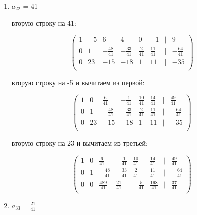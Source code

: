 \documentclass{report}
\begin{document}
\begin{itemize}
\begin{enumerate}
\begin{itemize}
		\end{itemize}
		
		
		\item{$a_{22}$ = 41}
		
		\begin{itemize}
			 вторую строку на 41:
			
			\begin{center}
				\Large{
					\[
					\begin{pmatrix}
						1 & -5 & 6 & 4 & 0 & -1 & | & 9 \\
						0 & 1 & -\frac{48}{41} & -\frac{33}{41} & \frac{2}{41} & \frac{11}{41} & | & -\frac{64}{41} \\
						0 & 23 & -15 & -18 & 1 & 11 & | & -35 \\
					\end{pmatrix}
					\]
				}
			\end{center}
			
			 вторую строку на -5 и вычитаем из первой:
			
			\begin{center}
				\Large{
					\[
					\begin{pmatrix}
						1 & 0 & \frac{6}{41} & -\frac{1}{41} & \frac{10}{41} & \frac{14}{41} & | & \frac{49}{41} \\
						0 & 1 & -\frac{48}{41} & -\frac{33}{41} & \frac{2}{41} & \frac{11}{41} & | & -\frac{64}{41} \\
						0 & 23 & -15 & -18 & 1 & 11 & | & -35 \\
					\end{pmatrix}
					\]
				}
			\end{center}
			
			 вторую строку на 23 и вычитаем из третьей:
			
			\begin{center}
				\Large{
					\[
					\begin{pmatrix}
						1 & 0 & \frac{6}{41} & -\frac{1}{41} & \frac{10}{41} & \frac{14}{41} & | & \frac{49}{41} \\
						0 & 1 & -\frac{48}{41} & -\frac{33}{41} & \frac{2}{41} & \frac{11}{41} & | & -\frac{64}{41} \\
						0 & 0 & \frac{489}{41} & \frac{21}{41} & -\frac{5}{41} & \frac{198}{41} & | & \frac{37}{41} \\
					\end{pmatrix}
					\]
				}
			\end{center}
		\end{itemize}
				\item{$a_{33}=\frac{21}{41}$}
				

\end{enumerate}
\end{itemize}
\end{document}
